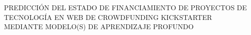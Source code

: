 \thispagestyle{plain}
\begin{center}
	\vspace*{10cm}
	{PREDICCIÓN DEL ESTADO DE FINANCIAMIENTO DE PROYECTOS DE TECNOLOGÍA EN WEB DE CROWDFUNDING KICKSTARTER MEDIANTE MODELO(S) DE APRENDIZAJE PROFUNDO}
\end{center}
